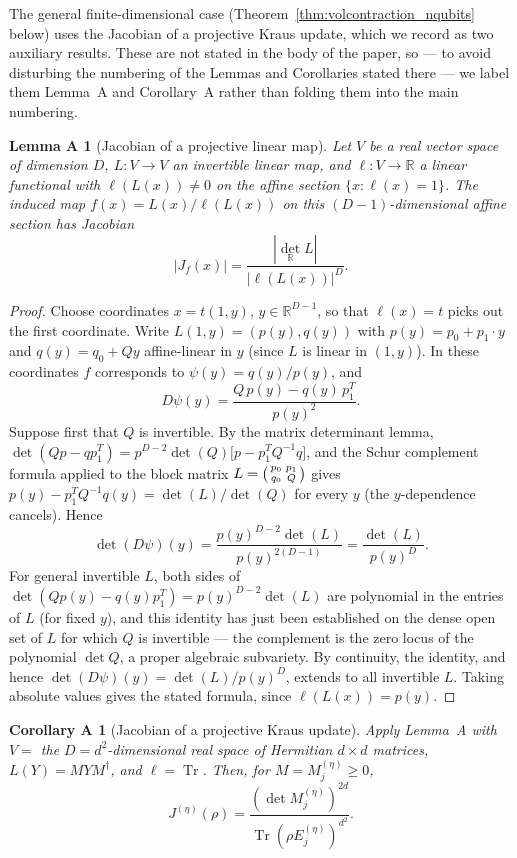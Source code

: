 \documentclass[11pt, onecolumn]{article}
\newtheorem*{lemmaA}{Lemma A}
\newtheorem*{corollaryA}{Corollary A}
\begin{document}
\medskip
\noindent
The general finite-dimensional case (Theorem~\ref{thm:volcontraction_nqubits} below) uses the Jacobian of a projective Kraus update, which we record as two auxiliary results. These are not stated in the body of the paper, so — to avoid disturbing the numbering of the Lemmas and Corollaries stated there — we label them Lemma~A and Corollary~A rather than folding them into the main numbering.

\begin{lemmaA}[Jacobian of a projective linear map]
\label{lem:projective-jacobian}
Let $V$ be a real vector space of dimension $D$, $L:V\to V$ an invertible linear map, and $\ell:V\to\mathbb R$ a linear functional with $\ell(L(x))\neq0$ on the affine section $\{x:\ell(x)=1\}$. The induced map $f(x)=L(x)/\ell(L(x))$ on this $(D-1)$-dimensional affine section has Jacobian
\[
|J_f(x)| = \frac{|\det_{\mathbb R}L|}{|\ell(L(x))|^D}.
\]
\end{lemmaA}

\begin{proof}
Choose coordinates $x=t(1,y)$, $y\in\mathbb R^{D-1}$, so that $\ell(x)=t$ picks out the first coordinate. Write $L(1,y)=(p(y),q(y))$ with $p(y)=p_0+p_1\cdot y$ and $q(y)=q_0+Qy$ affine-linear in $y$ (since $L$ is linear in $(1,y)$). In these coordinates $f$ corresponds to $\psi(y)=q(y)/p(y)$, and
\[
D\psi(y) = \frac{Q\,p(y)-q(y)\,p_1^T}{p(y)^2}.
\]
Suppose first that $Q$ is invertible. By the matrix determinant lemma, $\det(Qp-qp_1^T)=p^{D-2}\det(Q)\bigl[p-p_1^TQ^{-1}q\bigr]$, and the Schur complement formula applied to the block matrix $L=\begin{psmallmatrix}p_0&p_1\\q_0&Q\end{psmallmatrix}$ gives $p(y)-p_1^TQ^{-1}q(y)=\det(L)/\det(Q)$ for every $y$ (the $y$-dependence cancels). Hence
\[
\det(D\psi)(y)=\frac{p(y)^{D-2}\det(L)}{p(y)^{2(D-1)}}=\frac{\det(L)}{p(y)^D}.
\]
For general invertible $L$, both sides of $\det(Qp(y)-q(y)p_1^T)=p(y)^{D-2}\det(L)$ are polynomial in the entries of $L$ (for fixed $y$), and this identity has just been established on the dense open set of $L$ for which $Q$ is invertible — the complement is the zero locus of the polynomial $\det Q$, a proper algebraic subvariety. By continuity, the identity, and hence $\det(D\psi)(y)=\det(L)/p(y)^D$, extends to all invertible $L$. Taking absolute values gives the stated formula, since $\ell(L(x))=p(y)$.
\end{proof}

\begin{corollaryA}[Jacobian of a projective Kraus update]
\label{cor:kraus-jacobian}
Apply Lemma~A with $V=$ the $D=d^2$-dimensional real space of Hermitian $d\times d$ matrices, $L(Y)=MYM^\dagger$, and $\ell=\operatorname{Tr}$. Then, for $M=M_j^{(\eta)}\ge0$,
\[
J^{(\eta)}(\rho) = \frac{(\det M_j^{(\eta)})^{2d}}{\operatorname{Tr}(\rho E_j^{(\eta)})^{d^2}}.
\]
\end{corollaryA}
\end{document}
